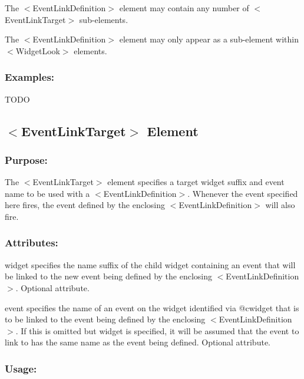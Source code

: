 \begin{DoxyItemize}
\item The {\ttfamily $<$Event\+Link\+Definition$>$} element may contain any number of {\ttfamily $<$Event\+Link\+Target$>$} sub-\/elements. 
\item The {\ttfamily $<$Event\+Link\+Definition$>$} element may only appear as a sub-\/element within {\ttfamily $<$Widget\+Look$>$} elements. 
\end{DoxyItemize}\hypertarget{fal_element_ref_fal_elem_ref_eventlinkdefintion_4}{}\subsubsection{Examples\+:}\label{fal_element_ref_fal_elem_ref_eventlinkdefintion_4}
T\+O\+DO\hypertarget{fal_element_ref_fal_elem_ref_eventlinktarget}{}\subsection{$<$\+Event\+Link\+Target$>$ Element}\label{fal_element_ref_fal_elem_ref_eventlinktarget}
\hypertarget{fal_element_ref_fal_elem_ref_eventlinktarget_1}{}\subsubsection{Purpose\+:}\label{fal_element_ref_fal_elem_ref_eventlinktarget_1}
The {\ttfamily $<$Event\+Link\+Target$>$} element specifies a target widget suffix and event name to be used with a {\ttfamily $<$Event\+Link\+Definition$>$}. Whenever the event specified here fires, the event defined by the enclosing {\ttfamily $<$Event\+Link\+Definition$>$} will also fire.\hypertarget{fal_element_ref_fal_elem_ref_eventlinktarget_2}{}\subsubsection{Attributes\+:}\label{fal_element_ref_fal_elem_ref_eventlinktarget_2}
\begin{DoxyItemize}
\item {\ttfamily widget} specifies the name suffix of the child widget containing an event that will be linked to the new event being defined by the enclosing {\ttfamily $<$Event\+Link\+Definition$>$}. Optional attribute. \item {\ttfamily event} specifies the name of an event on the widget identified via @cwidget that is to be linked to the event being defined by the enclosing {\ttfamily $<$Event\+Link\+Definition$>$}. If this is omitted but {\ttfamily widget} is specified, it will be assumed that the event to link to has the same name as the event being defined. Optional attribute.\end{DoxyItemize}
\hypertarget{fal_element_ref_fal_elem_ref_eventlinktarget_3}{}\subsubsection{Usage\+:}\label{fal_element_ref_fal_elem_ref_eventlinktarget_3}

